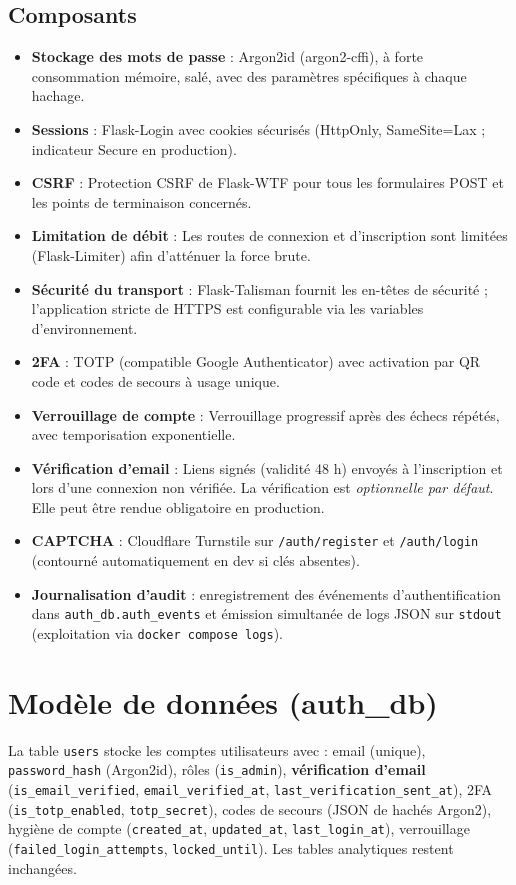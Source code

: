 \subsection{Composants}
\begin{itemize}
  \item \textbf{Stockage des mots de passe} : Argon2id (argon2-cffi), à forte consommation mémoire, salé, avec des paramètres spécifiques à chaque hachage.
  \item \textbf{Sessions} : Flask-Login avec cookies sécurisés (HttpOnly, SameSite=Lax ; indicateur Secure en production).
  \item \textbf{CSRF} : Protection CSRF de Flask-WTF pour tous les formulaires POST et les points de terminaison concernés.
  \item \textbf{Limitation de débit} : Les routes de connexion et d'inscription sont limitées (Flask-Limiter) afin d'atténuer la force brute.
  \item \textbf{Sécurité du transport} : Flask-Talisman fournit les en-têtes de sécurité ; l'application stricte de HTTPS est configurable via les variables d'environnement.
  \item \textbf{2FA} : TOTP (compatible Google Authenticator) avec activation par QR code et codes de secours à usage unique.
  \item \textbf{Verrouillage de compte} : Verrouillage progressif après des échecs répétés, avec temporisation exponentielle.
  \item \textbf{Vérification d'email} : Liens signés (validité 48 h) envoyés à l'inscription et lors d'une connexion non vérifiée. La vérification est \emph{optionnelle par défaut}. Elle peut être rendue obligatoire en production.
  \item \textbf{CAPTCHA} : Cloudflare Turnstile sur \texttt{/auth/register} et \texttt{/auth/login} (contourné automatiquement en dev si clés absentes).
  \item \textbf{Journalisation d'audit} : enregistrement des événements d'authentification dans \texttt{auth\_db.auth\_events} et émission simultanée de logs JSON sur \texttt{stdout} (exploitation via \texttt{docker compose logs}).
\end{itemize}

\section{Modèle de données (auth\_db)}
La table \texttt{users} stocke les comptes utilisateurs avec : email (unique), \texttt{password\_hash} (Argon2id), rôles (\texttt{is\_admin}), \textbf{vérification d'email} (\texttt{is\_email\_verified}, \texttt{email\_verified\_at}, \texttt{last\_verification\_sent\_at}), 2FA (\texttt{is\_totp\_enabled}, \texttt{totp\_secret}), codes de secours (JSON de hachés Argon2), hygiène de compte (\texttt{created\_at}, \texttt{updated\_at}, \texttt{last\_login\_at}), verrouillage (\texttt{failed\_login\_attempts}, \texttt{locked\_until}). Les tables analytiques restent inchangées.


